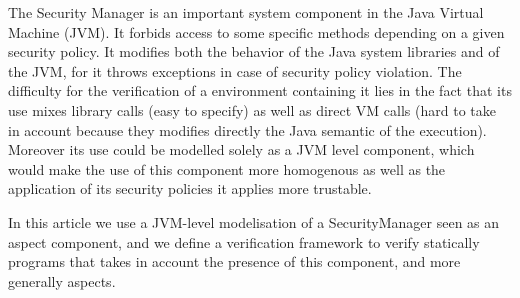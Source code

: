 The Security Manager is an important system component in the Java
Virtual Machine (JVM).  It forbids access to some specific methods
depending on a given security policy.  It modifies both the behavior
of the Java system libraries and of the JVM, for it throws exceptions
in case of security policy violation.  The difficulty for the
verification of a environment containing it lies in the fact that its
use mixes library calls (easy to specify) as well as direct VM calls
(hard to take in account because they modifies directly the Java
semantic of the execution).  Moreover its use could be modelled solely
as a JVM level component, which would make the use of this component
more homogenous as well as the application of its security policies it
applies more trustable.

In this article we use a JVM-level modelisation of a SecurityManager
seen as an aspect component, and we define a verification framework to
verify statically programs that takes in account the presence of this
component, and more generally aspects.